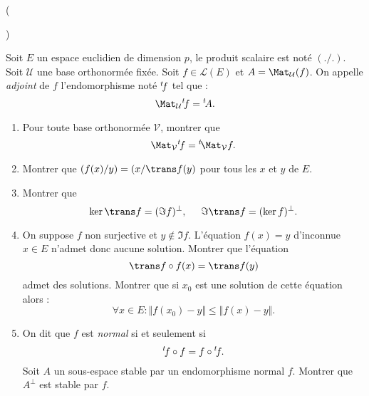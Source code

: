 \begin{tiny}()\end{tiny} Soit $E$ un espace euclidien de dimension $p$, le produit scalaire est noté $(./.)$. Soit $\mathcal U$ une base orthonormée fixée. Soit $f\in \mathcal L(E)$ et $A = \Mat_{\mathcal{U}}(f)$. On appelle \emph{adjoint} de $f$ l'endomorphisme noté $\mathstrut^t\!f$ tel que :
\begin{displaymath}
 \Mat_{\mathcal U}\mathstrut^t\!f = \mathstrut^t\!A.
\end{displaymath}
\begin{enumerate}
 \item Pour toute base orthonormée $\mathcal V$, montrer que
\begin{displaymath}
 \Mat_{\mathcal V}\mathstrut^t\!f = \mathstrut^t\!\Mat_{\mathcal V}f.
\end{displaymath}
\item Montrer que $(f(x)/y)=(x/\trans f(y)$ pour tous les $x$ et $y$ de $E$.
\item Montrer que 
\begin{displaymath}
 \ker \trans f= (\Im f)^\bot , \hspace{0.5cm} \Im \trans f = (\ker f)^\bot.
\end{displaymath}
\item On suppose $f$ non surjective et $y \notin \Im f$. L'équation $f(x)=y$ d'inconnue $x\in E$
 n'admet donc aucune solution. Montrer que l'équation
\begin{displaymath}
 \trans f \circ f(x)= \trans f (y)
\end{displaymath}
admet des solutions. Montrer que si $x_0$ est une solution de cette équation alors :
\begin{displaymath}
 \forall x\in E : \Vert f(x_0)-y\Vert  \leq  \Vert f(x)-y\Vert.
\end{displaymath}
\item On dit que $f$ est \emph{normal} si et seulement si 
\begin{displaymath}
  \mathstrut^t\!f \circ f  = f \circ \mathstrut^t\!f .
\end{displaymath}
Soit $A$ un sous-espace stable par un endomorphisme normal $f$. Montrer que $A^{\bot}$ est stable par $f$. 
\end{enumerate}
